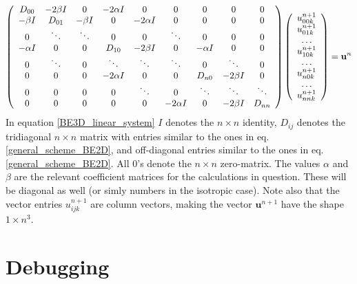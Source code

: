 \begin{align}\label{BE3D_linear_system}
  \left(\begin{array}{c c c c c c c c c}
        D_{00} & -2\beta I &0 &-2\alpha I &0 &0 &0 &0 &0\\
        -\beta I & D_{01} & -\beta I &0 &-2\alpha I &0 &0 &0 &0\\
        0&\ddots & \ddots & 0 & 0 & \ddots &0&0&0\\
        -\alpha I& 0&0 & D_{10} & -2\beta I& 0 & -\alpha I &0&0\\
        0& \ddots&0&\ddots & \ddots & \ddots & 0 & \ddots &0\\
        0& 0 &0 &-2\alpha I &0&0 & D_{n0} & -2\beta I&0\\
        0& 0 &0 &0 &\ddots&0&\ddots & \ddots &\ddots\\
         0&0 &0 &0&0 &-2\alpha I&0&-2\beta I & D_{nn}
       \end{array}\right)
       \left(\begin{array}{c}
             u^{n+1}_{00k}\\
             u^{n+1}_{01k}\\
             \dots\\
             u^{n+1}_{10k}\\
             \dots\\
             u^{n+1}_{n0k}\\
             \dots\\
             u^{n+1}_{nnk}
             \end{array}\right) = \mathbf{u}^{n}
\end{align}
In equation \ref{BE3D_linear_system} $I$ denotes the $n\times n$ identity, $D_{ij}$ denotes the tridiagonal $n\times n$ matrix with entries similar to the ones in eq. \ref{general_scheme_BE2D}, and off-diagonal entries similar to the ones in eq. \ref{general_scheme_BE2D}. 
All $0$'s denote the $n\times n$ zero-matrix. The values $\alpha$ and $\beta$ are the relevant coefficient matrices for the calculations in question. These will be diagonal as well (or simly numbers in the isotropic case). 
Note also that the vector entries $u^{n+1}_{ijk}$ are column vectors, making the vector $\mathbf{u}^{n+1}$ have the shape $1\times n^3$.


\section{Debugging}\label{debugging}

